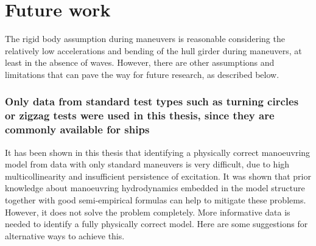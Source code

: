 \chapter{Future work\label{ch:future_work}}

\noindent The rigid body assumption during maneuvers is reasonable considering the relatively low accelerations and bending of the hull girder during maneuvers, at least in the absence of waves. However, there are other assumptions and limitations that can pave the way for future research, as described below.

\subsection*{Only data from standard test types such as turning circles or zigzag tests were used in this thesis, since they are commonly available for ships}
It has been shown in this thesis that identifying a physically correct manoeuvring model from data with only standard maneuvers is very difficult, due to high multicollinearity and insufficient persistence of excitation. 
It was shown that prior knowledge about manoeuvring hydrodynamics embedded in the model structure together with good semi-empirical formulas can help to mitigate these problems.
However, it does not solve the problem completely. More informative data is needed to identify a fully physically correct model. Here are some suggestions for alternative ways to achieve this.
